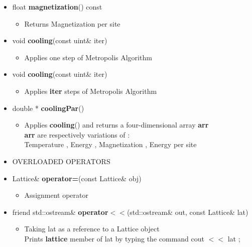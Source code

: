 \begin{itemize}
\begin{itemize}
			\item[] float \textbf{magnetization}() const		 
			\begin{itemize}
				\item[] Returns Magnetization per site  
				
			\end{itemize}
			
			\item[] void \textbf{cooling}(const uint\& iter) 		 
			\begin{itemize}
				\item[] Applies one step of Metropolis Algorithm 
			\end{itemize}
			
			
			\item[] void \textbf{cooling}(const uint\& iter) 		 
			\begin{itemize}
				\item[] Applies \textbf{iter} steps of Metropolis Algorithm
			\end{itemize}
			
			\item[] double * \textbf{coolingPar}()	 
			\begin{itemize}
				\item[] Applies \textbf{cooling}() and returns a four-dimensional array \textbf{arr} \\
						\textbf{arr} are respectively variations of : \\
						Temperature , Energy , Magnetization , Energy per site  \\
			\end{itemize}
		
		\item[] 
		OVERLOADED OPERATORS \\

			\item[] Lattice\& \textbf{operator=}(const Lattice\& obj)		 
			\begin{itemize}
				\item[] Assignment operator \\
			\end{itemize}
			
			\item[] friend std::ostream\& \textbf{operator$<<$}(std::ostream\& out, const Lattice\& lat) 	
			\begin{itemize}
				\item[] Taking \textsf{lat} as a reference to a Lattice object \\
				Prints \textbf{lattice} member of \textsf{lat} by typing the command \textsf{cout $<<$ lat ;} 
			\end{itemize}	
			

\end{itemize}
\end{itemize}
